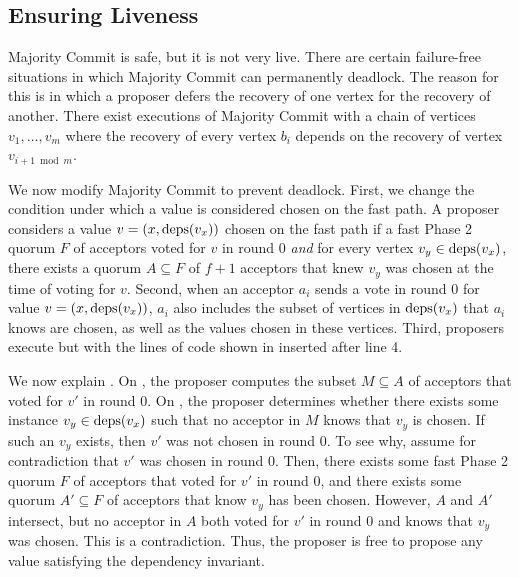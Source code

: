 \subsection{Ensuring Liveness}
Majority Commit \BPaxos{} is safe, but it is not very live. There are certain
failure-free situations in which Majority Commit \BPaxos{} can permanently
deadlock. The reason for this is  in which a proposer
defers the recovery of one vertex for the recovery of another. There exist
executions of Majority Commit \BPaxos{} with a chain of vertices $v_1, \ldots,
v_m$ where the recovery of every vertex $b_i$ depends on the recovery of
vertex $v_{i+1 \bmod m}$.

We now modify Majority Commit \BPaxos{} to prevent deadlock.
%
First, we change the condition under which a value is considered chosen on the
fast path. A proposer considers a value $v = (x, \text{deps}(v_x))$ chosen on the
fast path if a fast Phase 2 quorum $F$ of acceptors voted for $v$ in round $0$
\emph{and} for every vertex $v_y \in \text{deps}(v_x)$, there exists a quorum  $A
\subseteq F$ of $f + 1$ acceptors that knew $v_y$ was chosen at the time of
voting for $v$.
%
Second, when an acceptor $a_i$ sends a  vote in round $0$ for
value $v = (x, \text{deps}(v_x))$, $a_i$ also includes the subset of vertices in
$\text{deps}(v_x)$ that $a_i$ knows are chosen, as well as the values chosen in these
vertices.
%
Third, proposers execute  but with
the lines of code shown in  inserted after line
4.



We now explain . On
, the proposer computes the subset $M \subseteq A$ of acceptors
that voted for $v'$ in round $0$. On , the proposer
determines whether there exists some instance $v_y \in \text{deps}(v_x)$ such that no
acceptor in $M$ knows that $v_y$ is chosen. If such an $v_y$ exists, then $v'$
was not chosen in round $0$. To see why, assume for contradiction that $v'$ was
chosen in round $0$. Then, there exists some fast Phase 2 quorum $F$ of
acceptors that voted for $v'$ in round $0$, and there exists some quorum $A'
\subseteq F$ of acceptors that know $v_y$ has been chosen. However, $A$ and
$A'$ intersect, but no acceptor in $A$ both voted for $v'$ in round $0$ and
knows that $v_y$ was chosen.  This is a contradiction. Thus, the proposer is
free to propose any value satisfying the dependency invariant.

